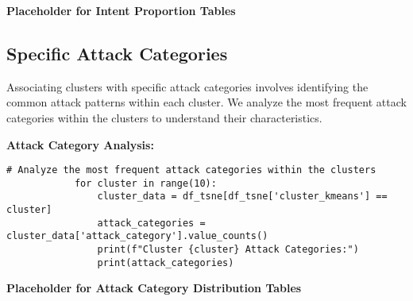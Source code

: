         \vspace{1em}

        \textbf{Placeholder for Intent Proportion Tables}
        
    \subsection{Specific Attack Categories}
    
        Associating clusters with specific attack categories involves identifying the common attack patterns within each cluster. We analyze the most frequent attack categories within the clusters to understand their characteristics.

        \textbf{Attack Category Analysis:}

        \begin{lstlisting}[caption={Attack Categories Analysis by Cluster}, label={lst:attack_categories}]
            # Analyze the most frequent attack categories within the clusters
            for cluster in range(10):
                cluster_data = df_tsne[df_tsne['cluster_kmeans'] == cluster]
                attack_categories = cluster_data['attack_category'].value_counts()
                print(f"Cluster {cluster} Attack Categories:")
                print(attack_categories)
        \end{lstlisting}
        
        \vspace{1em}

        \textbf{Placeholder for Attack Category Distribution Tables}
